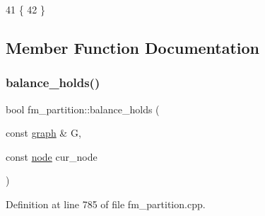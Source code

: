 \begin{DoxyCode}
41 \{
42 \}
\end{DoxyCode}


\subsection{Member Function Documentation}
\mbox{\label{classfm__partition_a6dc702df474c4ce60e80b3e5a93b7f4d}} 
\subsubsection{\texorpdfstring{balance\+\_\+holds()}{balance\_holds()}}
{\footnotesize\ttfamily bool fm\+\_\+partition\+::balance\+\_\+holds (\begin{DoxyParamCaption}\item[{const \mbox{\hyperlink{classgraph}{graph}} \&}]{G,  }\item[{const \mbox{\hyperlink{classnode}{node}}}]{cur\+\_\+node }\end{DoxyParamCaption})\hspace{0.3cm}{\ttfamily [protected]}}



Definition at line 785 of file fm\+\_\+partition.\+cpp.


